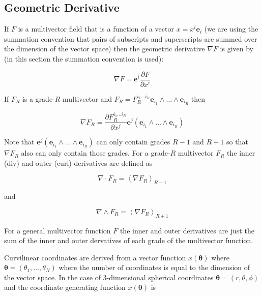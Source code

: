 \documentclass[10pt]{article}
\newcommand{\bfrac}[2]{\displaystyle\frac{#1}{#2}}
\newcommand{\lp}{\left (}
\newcommand{\rp}{\right )}
\newcommand{\W}{\wedge}
\begin{document}
\subsection{Geometric Derivative}

If $F$ is a multivector field that is a function of a vector
$x = x^{i}\bm{e}_{i}$ (we are using the summation convention that
pairs of subscripts and superscripts are summed over the dimension of the vector
space) then the geometric derivative $\nabla F$ is given by (in this
section the summation convention is used):

  \begin{equation}
    \nabla F = \bm{e}^{i}\bfrac{\partial F}{\partial x^{i}}
  \end{equation}

If $F_{R}$ is a grade-$R$ multivector and
$F_{R} = F_{R}^{i_{1}\dots i_{R}}\bm{e}_{i_{1}}\W\dots\W \bm{e}_{i_{R}}$
then

  \begin{equation}
    \nabla F_{R} = \bfrac{\partial F_{R}^{i_{1}\dots i_{R}}}{\partial x^{j}}\bm{e}^{j}\lp\bm{e}_{i_{1}}\W
                 \dots\W \bm{e}_{i_{R}} \rp
  \end{equation}


Note that
$\bm{e}^{j}\lp\bm{e}_{i_{1}}\W\dots\W \bm{e}_{i_{R}} \rp$
can only contain grades $R-1$ and $R+1$ so that $\nabla F_{R}$
also can only contain those grades. For a grade-$R$ multivector
$F_{R}$ the inner (div) and outer (curl) derivatives are defined as

  \begin{equation}
  \nabla\cdot F_{R} = \left < \nabla F_{R}\right >_{R-1}
  \end{equation}

and

  \begin{equation}
  \nabla\W F_{R} = \left < \nabla F_{R}\right >_{R+1}
  \end{equation}

For a general multivector function $F$ the inner and outer derivatives are
just the sum of the inner and outer dervatives of each grade of the multivector
function.

Curvilinear coordinates are derived from a vector function
$x(\bm{\theta})$ where
$\bm{\theta} = \lp\theta_{1},\dots,\theta_{N}\rp$ where the number of
coordinates is equal to the dimension of the vector space.  In the case of
3-dimensional spherical coordinates $\bm{\theta} = \lp r,\theta,\phi \rp$
and the coordinate generating function $x(\bm{\theta})$ is
\end{document}
